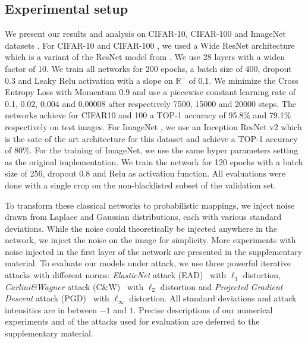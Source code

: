 \subsection{Experimental setup}

We present our results and analysis on  CIFAR-10, CIFAR-100 \cite{krizhevsky2009learning} and ImageNet datasets \cite{imagenet_cvpr09}.
For CIFAR-10 and CIFAR-100 \cite{krizhevsky2009learning}, we used a Wide ResNet architecture \cite{ZagoruykoK16} which is a variant of the ResNet model from \cite{He_2016_CVPR}.
We use 28 layers with a widen factor of 10.
We train all networks for 200 epochs, a batch size of 400, dropout 0.3 and Leaky Relu activation with a slope on $\mathbb{R}^-$ of 0.1.
We minimize the Cross Entropy Loss with Momentum 0.9 and use a piecewise constant learning rate of 0.1, 0.02, 0.004 and 0.00008 after respectively 7500, 15000 and 20000 steps.
The networks achieve for CIFAR10 and 100 a TOP-1 accuracy of 95.8\% and 79.1\% respectively on test images.
For ImageNet \cite{imagenet_cvpr09}, we use an Inception ResNet v2 \cite{szegedy2017inception} which is the sate of the art architecture for this dataset and achieve a TOP-1 accuracy of 80\%.
For the training of ImageNet, we use the same hyper parameters setting as the original implementation.
We train the network for 120 epochs with a batch size of 256, dropout 0.8 and Relu as activation function.
All evaluations were done with a single crop on the non-blacklisted subset of the validation set.

To transform these classical networks to probabilistic mappings, we inject noise drawn from Laplace and Gaussian distributions, each with various standard deviations.
While the noise could theoretically be injected anywhere in the network, we inject the noise on the image for simplicity.
More experiments with noise injected in the first layer of the network are presented in the supplementary material.
To evaluate our models under attack, we use three powerful iterative attacks with different norms: \emph{ElasticNet} attack (EAD)~\cite{chen2018ead} with $\ell_1$ distortion, \emph{Carlini\&Wagner} attack (C\&W)~\cite{carlini2017towards} with $\ell_2$ distortion and \emph{Projected Gradient Descent} attack (PGD)~\cite{madry2018towards} with $\ell_\infty$ distortion.
All standard deviations and attack intensities are in between $-1$ and $1$.
Precise descriptions of our numerical experiments and of the attacks used for evaluation are deferred to the supplementary material.

